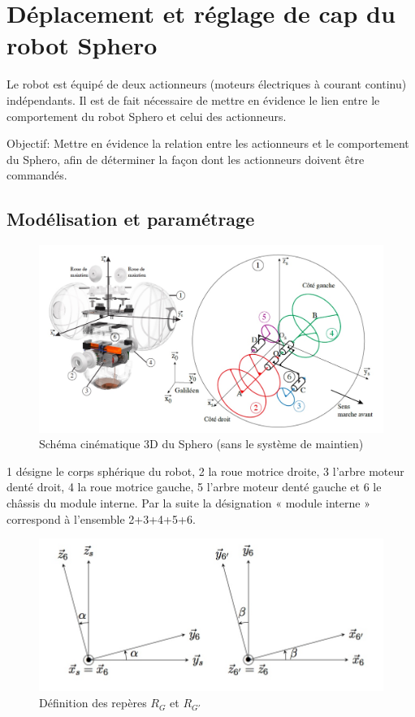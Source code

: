 \vspace{-1.5cm}

\section{Déplacement et réglage de cap du robot Sphero} 

Le robot est équipé de deux actionneurs (moteurs électriques à courant continu) indépendants. Il est de fait nécessaire de mettre en évidence le lien entre le comportement du robot Sphero et celui des actionneurs. 

Objectif: Mettre en évidence la relation entre les actionneurs et le comportement du Sphero, afin de déterminer la façon dont les actionneurs doivent être commandés. 

\subsection{Modélisation et paramétrage}

\begin{figure}[!ht]\begin{center}
 \includegraphics[width=0.67\linewidth]{img/figure_10}
 \caption{Schéma cinématique 3D du Sphero (sans le système de maintien)}
 \label{fig10}
\end{center}\end{figure}

1 désigne le corps sphérique du robot, 2 la roue motrice droite, 3 l'arbre moteur denté droit, 4 la roue motrice gauche, 5 l'arbre moteur denté gauche et 6 le châssis du module interne. Par la suite la désignation « module interne » correspond à l'ensemble 2+3+4+5+6. 

\begin{figure}[!ht]\begin{center}
 \includegraphics[width=0.6\linewidth]{img/figure_11}
 \caption{Définition des repères $R_G$ et $R_{G'}$}
 \label{fig11}
\end{center}\end{figure}

